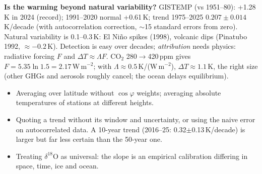 \textbf{Is the warming beyond natural variability?} GISTEMP (vs 1951--80): +1.28\,K in 2024 (record); 1991--2020 normal
+0.61\,K; trend 1975--2025 $0.207\pm0.014$\,K/decade (with autocorrelation correction, $\sim$15 standard errors from zero).
Natural variability is 0.1--0.3\,K: El Niño spikes (1998), volcanic dips (Pinatubo 1992, $\approx-0.2$\,K). Detection is easy
over decades; \emph{attribution} needs physics: radiative forcing $F$ and $\Delta T\approx\Lambda F$. CO$_2$ 280$\to$420\,ppm gives
$F=5.35\ln1.5=2.17$\,W\,m$^{-2}$; with $\Lambda\approx0.5$\,K/(W\,m$^{-2}$), $\Delta T\approx1.1$\,K, the right size (other GHGs and
aerosols roughly cancel; the ocean delays equilibrium).

\begin{trap}
\begin{itemize}
\item Averaging over latitude without $\cos\varphi$ weights; averaging absolute temperatures of stations at different heights.
\item Quoting a trend without its window and uncertainty, or using the naive error on autocorrelated data. A 10-year trend
(2016--25: 0.32$\pm$0.13\,K/decade) is larger but far less certain than the 50-year one.
\item Treating $\delta^{18}$O as universal: the slope is an empirical calibration differing in space, time, ice and ocean.
\end{itemize}
\end{trap}

